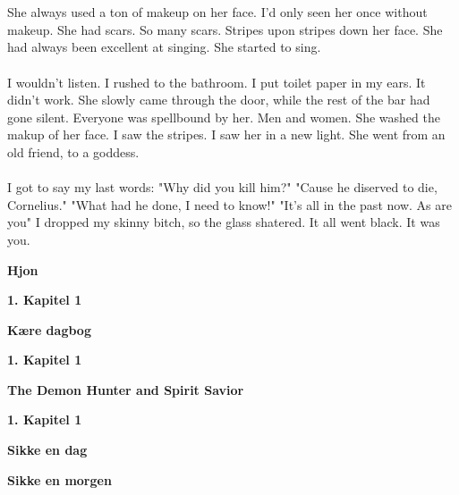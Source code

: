 \documentclass[]{article}
\begin{document}
\\ \\
She always used a ton of makeup on her face. I'd only seen her once without makeup. She had scars. So many scars. Stripes upon stripes down her face. She had always been excellent at singing. She started to sing.
\\ \\
I wouldn't listen. I rushed to the bathroom. I put toilet paper in my ears. It didn't work. She slowly came through the door, while the rest of the bar had gone silent. Everyone was spellbound by her. Men and women. She washed the makup of her face. I saw the stripes. I saw her in a new light. She went from an old friend, to a goddess. 
\\ \\
I got to say my last words: "Why did you kill him?" "Cause he diserved to die, Cornelius." "What had he done, I need to know!" "It's all in the past now. As are you" I dropped my skinny bitch, so the glass shatered. It all went black. It was you.

\newpage

\begin{center}
	\Large\textbf{Hjon}
\end{center}

\begin{center}
	\large\textbf{1. Kapitel 1}
\end{center}

\newpage

\begin{center}
	\Large\textbf{Kære dagbog}
\end{center}

\begin{center}
	\large\textbf{1. Kapitel 1}
\end{center}

\newpage

\begin{center}
	\Large\textbf{The Demon Hunter and Spirit Savior}
\end{center}

\begin{center}
	\large\textbf{1. Kapitel 1}
\end{center}

\newpage

\begin{center}
	\Large\textbf{Sikke en dag}
\end{center}

\begin{center}
	\large\textbf{Sikke en morgen}
\end{center}
\end{document}
